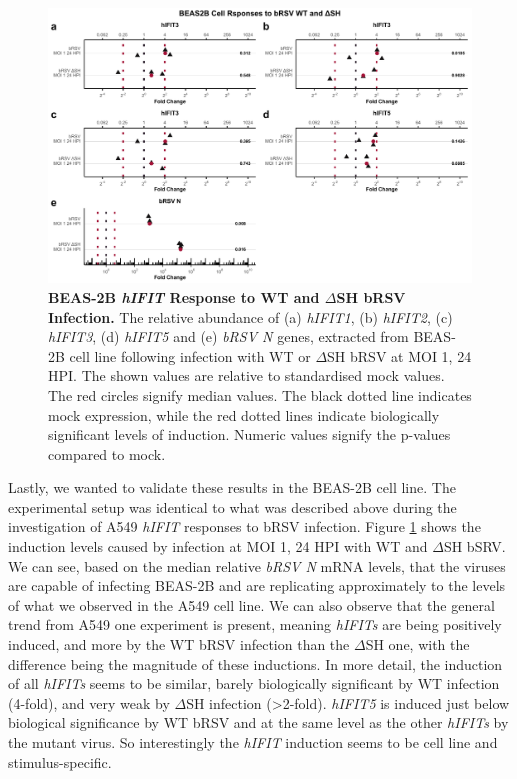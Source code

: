 \begin{figure}
    \centering
    \includegraphics[width=1\linewidth]{06. Chapter 1/Figs/01. Induction/11. beas2b_brsv_moi1.pdf}
    \caption[BEAS-2B \textit{hIFIT} Response to WT and \(\Delta\)SH bRSV Infection.]{\textbf{BEAS-2B \textit{hIFIT} Response to WT and \(\Delta\)SH bRSV Infection.} The relative abundance of (a) \textit{hIFIT1}, (b) \textit{hIFIT2}, (c) \textit{hIFIT3}, (d) \textit{hIFIT5} and (e) \textit{bRSV N} genes, extracted from BEAS-2B cell line following infection with WT or \(\Delta\)SH bRSV at MOI 1, 24 HPI.  The shown values are relative to standardised mock values. The red circles signify median values. The black dotted line indicates mock expression, while the red dotted lines indicate biologically significant levels of induction. Numeric values signify the p-values compared to mock.}
    \label{fig:BEAS-2B responses to bRSV WT and dSH.}
\end{figure}


Lastly, we wanted to validate these results in the BEAS-2B cell line. The experimental setup was identical to what was described above during the investigation of A549 \textit{hIFIT} responses to bRSV infection. Figure \ref{fig:BEAS-2B responses to bRSV WT and dSH.} shows the induction levels caused by infection at MOI 1, 24 HPI with WT and \(\Delta\)SH bSRV. We can see, based on the median relative \textit{bRSV N} mRNA levels, that the viruses are capable of infecting BEAS-2B and are replicating approximately to the levels of what we observed in the A549 cell line. We can also observe that the general trend from A549 one experiment is present, meaning \textit{hIFITs} are being positively induced, and more by the WT bRSV infection than the \(\Delta\)SH one, with the difference being the magnitude of these inductions. In more detail, the induction of all \textit{hIFITs} seems to be similar, barely biologically significant by WT infection (4-fold), and very weak by \(\Delta\)SH infection (>2-fold). \textit{hIFIT5} is induced just below biological significance by WT bRSV and at the same level as the other \textit{hIFITs} by the mutant virus. So interestingly the \textit{hIFIT} induction seems to be cell line and stimulus-specific.


